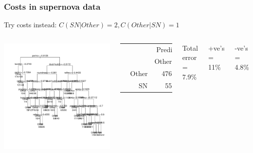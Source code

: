 \documentclass{beamer}
\begin{document}
\begin{frame}
	\frametitle{Costs in supernova data}
	Try costs instead: $C(SN|Other)=2, C(Other|SN)=1$
	\begin{columns}[c] 
			\includegraphics{treec1.pdf}
				\begin{table}
				\begin{tabular}{cr|rr}
				& & \multicolumn{2}{c}{Prediction}\\
				& & Other & SN\\
				\hline
				\multirow{2}{*}{\rotatebox{90}{Actual}} & Other &  476 &  24\\
				& SN & 55 &  445\\
				\end{tabular}
				\end{table}	
				Total error = 7.9\%
				
				+ve's = 11\%
				
				-ve's = 4.8\%
			\end{columns}
\end{frame}
\end{document}
